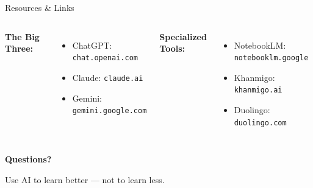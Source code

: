 \documentclass[aspectratio=169]{beamer}
\begin{document}
\begin{frame}{Resources \& Links}

\begin{columns}[T]
\textbf{\color{popblue}The Big Three:}
\begin{itemize}
  \item ChatGPT: \texttt{chat.openai.com}
  \item Claude: \texttt{claude.ai}
  \item Gemini: \texttt{gemini.google.com}
\end{itemize}

\textbf{\color{paramgreen}Specialized Tools:}
\begin{itemize}
  \item NotebookLM: \texttt{notebooklm.google}
  \item Khanmigo: \texttt{khanmigo.ai}
  \item Duolingo: \texttt{duolingo.com}
\end{itemize}
\end{columns}
\end{frame}

\begin{frame}{}

\begin{center}
\vspace{2cm}
{\Huge\color{popblue}\textbf{Questions?}}

\vspace{1.5cm}
{\large Use AI to learn better --- not to learn less.}
\end{center}
\end{frame}
\end{document}
